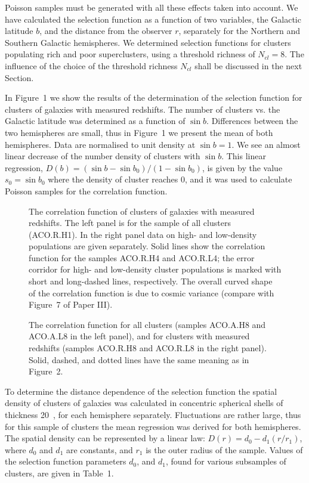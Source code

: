 Poisson samples must be generated with all these effects taken into account.
We have calculated the selection function as a function of two variables, the
Galactic latitude $b$, and the distance from the observer $r$, separately for
the Northern and Southern Galactic hemispheres. We determined selection
functions for clusters populating rich and poor superclusters, using a
threshold richness of $N_{cl}=8$.  The influence of the choice of the
threshold richness $N_{cl}$ shall be discussed in the next Section.

In Figure~1 we show the results of the determination of the selection function
for clusters of galaxies with measured redshifts.  The number of clusters vs.
the Galactic latitude was determined as a function of $\sin b$. Differences
between the two hemispheres are small, thus in Figure~1 we present the mean of
both hemispheres.  Data are normalised to unit density at $\sin b =1$. We see
an almost linear decrease of the number density of clusters with $\sin b$.
This linear regression, $D(b)=(\sin b - \sin b_0)/(1-\sin b_0)$, is given by
the value $s_0=\sin b_0$ where the density of cluster reaches 0, and it was
used to calculate Poisson samples for the correlation function.

\begin{figure}
\epsfysize=7cm
\vskip -17mm
\caption{
The correlation function of clusters of galaxies with measured
redshifts. The left panel is for the sample of all clusters
(ACO.R.H1). In the right panel data on high- and low-density
populations are given separately. Solid lines show the correlation
function for the samples ACO.R.H4 and ACO.R.L4; the error corridor for
high- and low-density cluster populations is marked with short and
long-dashed lines, respectively. The overall curved shape of the
correlation function is due to cosmic variance (compare with Figure~7
of Paper III).}
\label{fig2}
\end{figure}

\begin{figure}
\vskip -17mm
\epsfysize=7cm
\caption{
The correlation function for all clusters 
(samples ACO.A.H8 and ACO.A.L8 in the left panel), and for
clusters with measured redshifts (samples
ACO.R.H8 and ACO.R.L8 in the right panel).  
Solid, dashed, and dotted lines have the same meaning
as in Figure~2.}
\label{fig3}
\end{figure}

To determine the distance dependence of the selection function the
spatial density of clusters of galaxies was calculated in concentric
spherical shells of thickness 20~\Mpc, for each hemisphere separately.
Fluctuations are rather large, thus for this sample of clusters the
mean regression was derived for both hemispheres. The spatial density
can be represented by a linear law: $D(r)=d_0-d_1(r/r_1)$, where $d_0$
and $d_1$ are constants, and $r_1$ is the outer radius of the
sample. Values of the selection function parameters  $d_0$, and
$d_1$, found for various subsamples of clusters, are given in
Table~1. 

